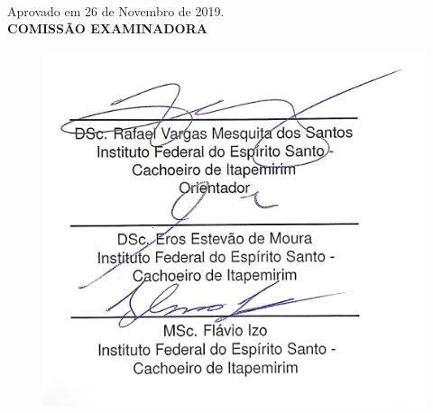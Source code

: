 
\begin{folhadeaprovacao}
  \begin{center}
    {\ABNTEXchapterfont\MakeTextUppercase{\imprimirautor}}\\
    \begin{center}
      \ABNTEXchapterfont\MakeTextUppercase{\imprimirtitulo}\\
    \end{center}
    \hspace{.45\textwidth}
    \begin{minipage}{.5\textwidth}
      {\footnotesize{\imprimirpreambulo}}\\
    \end{minipage}%
  \end{center}
  \vspace{-1cm}%
  \begin{center}
    Aprovado em 26 de Novembro de 2019.\\[15mm]
    \textbf{COMISSÃO EXAMINADORA}\\[5mm]
    \begin{figure}[H]
    	\centering %
    	\advance\rightskip-1.3cm
    	\includegraphics[width=12cm]{resources/aprovacao.png} %

\end{figure}
\end{center}
\end{folhadeaprovacao}

